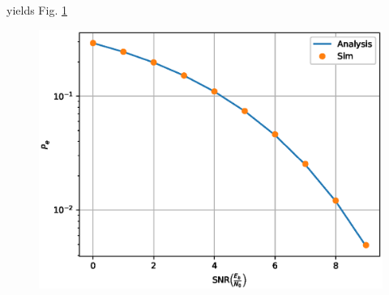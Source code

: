 \documentclass[journal,12pt,twocolumn]{IEEEtran}
\begin{document}
\begin{problem}
\begin{enumerate}

yields Fig. \ref{fig:qpsk_err}
\begin{figure}[!h]
\centering
\includegraphics[width=\columnwidth]{./figs/qpsk_err.eps}
\caption{}
\label{fig:qpsk_err}
\end{figure}
\end{enumerate}
\end{problem}
\end{document}
